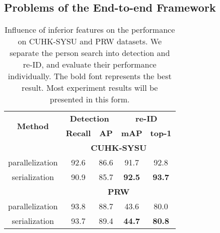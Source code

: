 \documentclass[letterpaper]{article} \usepackage{aaai21}  \usepackage{times}  \usepackage{helvet} \usepackage{courier}  \usepackage[hyphens]{url}  \usepackage{graphicx} \urlstyle{rm} \def\UrlFont{\rm}  \usepackage{natbib}  \usepackage{caption} \usepackage{multirow}
\begin{document}
\subsection{Problems of the End-to-end Framework}
\begin{table}[t]
    \centering
\resizebox{0.8\columnwidth}{!}
    {
    \begin{tabular}{|c|cc|cc|}
        \hline
        \multirow{2}{*}{\textbf{Method}} & \multicolumn{2}{c|}{\textbf{Detection}} & \multicolumn{2}{c|}{\textbf{re-ID}}                                  \\ \cline{2-5}
                                         & \textbf{Recall}                         & \multicolumn{1}{c|}{\textbf{AP}}    & \textbf{mAP}  & \textbf{top-1} \\ \hline \hline
        \multicolumn{1}{|c}{}            & \multicolumn{4}{c|}{\textbf{CUHK-SYSU}}                                                                        \\ \hline
        parallelization                  & 92.6                                    & 86.6                                & 91.7          & 92.8           \\
        serialization                    & 90.9                                    & 85.7                                & \textbf{92.5} & \textbf{93.7}  \\ \hline
        \multicolumn{1}{|c}{}            & \multicolumn{4}{c|}{\textbf{PRW}}                                                                              \\ \hline
        parallelization                  & 93.8                                    & 88.7                                & 43.6          & 80.0           \\
        serialization                    & 93.7                                    & 89.4                                & \textbf{44.7} & \textbf{80.8}  \\ \hline
    \end{tabular}
    }
    \caption{Influence of inferior features on the performance on CUHK-SYSU and PRW datasets. We separate the person search into detection and re-ID, and evaluate their performance individually. The bold font represents the best result. Most experiment results will be presented in this form.}
    \label{feature_misalignment}
\end{table}
\end{document}
